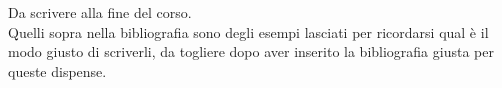Da scrivere alla fine del corso. \\
Quelli sopra nella bibliografia sono degli esempi lasciati per ricordarsi qual è il modo giusto di scriverli, da togliere dopo aver inserito la bibliografia giusta per queste dispense.
